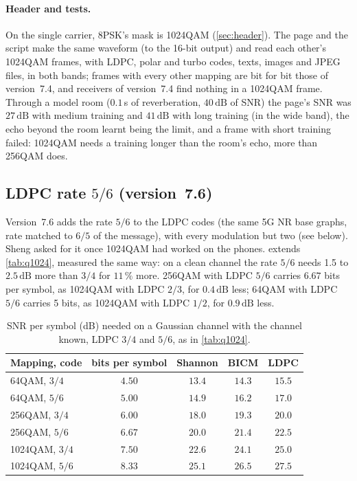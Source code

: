 \documentclass[11pt,a4paper]{article}
\newcommand{\dB}{\,\mathrm{dB}}
\theoremstyle{remark}
\begin{document}
\paragraph{Header and tests.}
On the single carrier, 8PSK's mask is 1024QAM (\cref{sec:header}). The page and the script make the same waveform (to the 16-bit output) and read each other's 1024QAM frames, with LDPC, polar and turbo codes, texts, images and JPEG files, in both bands; frames with every other mapping are bit for bit those of version~7.4, and receivers of version~7.4 find nothing in a 1024QAM frame. Through a model room ($0.1$\,s of reverberation, $40\dB$ of SNR) the page's SNR was $27\dB$ with medium training and $41\dB$ with long training (in the wide band), the echo beyond the room learnt being the limit, and a frame with short training failed: 1024QAM needs a training longer than the room's echo, more than 256QAM does.

\subsection{LDPC rate $5/6$ (version~7.6)}
\label{sec:ldpc56}
Version~7.6 adds the rate $5/6$ to the LDPC codes (the same 5G NR base graphs, rate matched to $6/5$ of the message), with every modulation but two (see below). Sheng asked for it once 1024QAM had worked on the phones.  extends \cref{tab:q1024}, measured the same way: on a clean channel the rate $5/6$ needs 1.5 to $2.5\dB$ more than $3/4$ for $11\,\%$ more. 256QAM with LDPC $5/6$ carries $6.67$ bits per symbol, as 1024QAM with LDPC $2/3$, for $0.4\dB$ less; 64QAM with LDPC $5/6$ carries 5 bits, as 1024QAM with LDPC $1/2$, for $0.9\dB$ less.

\begin{table}[ht]
\centering
\caption{SNR per symbol (dB) needed on a Gaussian channel with the channel known, LDPC $3/4$ and $5/6$, as in \cref{tab:q1024}.}
\label{tab:ldpc56}
\small
\begin{tabular}{lcccc}
\toprule
Mapping, code & bits per symbol & Shannon & BICM & LDPC\\
\midrule
64QAM, $3/4$ & $4.50$ & $13.4$ & $14.3$ & $15.5$\\
64QAM, $5/6$ & $5.00$ & $14.9$ & $16.2$ & $17.0$\\
256QAM, $3/4$ & $6.00$ & $18.0$ & $19.3$ & $20.0$\\
256QAM, $5/6$ & $6.67$ & $20.0$ & $21.4$ & $22.5$\\
1024QAM, $3/4$ & $7.50$ & $22.6$ & $24.1$ & $25.0$\\
1024QAM, $5/6$ & $8.33$ & $25.1$ & $26.5$ & $27.5$\\
\bottomrule
\end{tabular}
\end{table}
\end{document}
